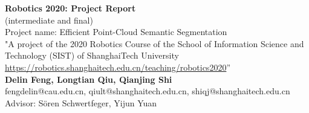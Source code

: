 \documentclass{article}
\begin{document}
	\begin{center}
    
    
		\LARGE{\textbf{Robotics 2020: Project Report}} \\
		(intermediate and final)\\
        \vspace{1em}
        \Large{Project name: Efficient Point-Cloud Semantic Segmentation} \\
        \small{"A project of the 2020 Robotics Course of the School of Information Science and Technology (SIST) of ShanghaiTech University \\ 
        \url{https://robotics.shanghaitech.edu.cn/teaching/robotics2020}”}\\
        \vspace{1em}
        \normalsize\textbf{Delin Feng, Longtian Qiu, Qianjing Shi} \\
        \normalsize{fengdelin@cau.edu.cn, qiult@shanghaitech.edu.cn, shiqj@shanghaitech.edu.cn} \\
        \vspace{1em}
        \normalsize{Advisor: Sören Schwertfeger, Yijun Yuan} \\
        \vspace{1em}
     
	\end{center}
\end{document}
